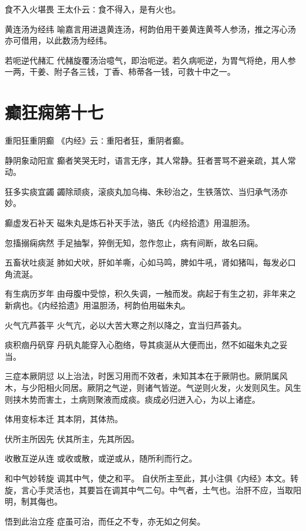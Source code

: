 \documentclass[a4paper,12pt,UTF8,twoside]{ctexbook}
\begin{document}
    食不入火堪畏
    王太仆云∶食不得入，是有火也。
    
    黄连汤为经纬
    喻嘉言用进退黄连汤，柯韵伯用干姜黄连黄芩人参汤，推之泻心汤亦可借用，以此数汤为经纬。
    
    若呃逆代赭汇
    代赭旋覆汤治噫气，即治呃逆。若久病呃逆，为胃气将绝，用人参一两，干姜、附子各三钱，丁香、柿蒂各一钱，可救十中之一。
    
    
    
    \section{癫狂痫第十七}
        
    重阳狂重阴癫
    《内经》云∶重阳者狂，重阴者癫。
    
    静阴象动阳宣
    癫者笑哭无时，语言无序，其人常静。狂者詈骂不避亲疏，其人常动。
    
    狂多实痰宜蠲
    蠲除顽痰，滚痰丸加乌梅、朱砂治之，生铁落饮、当归承气汤亦妙。
    
    癫虚发石补天
    磁朱丸是炼石补天手法，骆氏《内经拾遗》用温胆汤。
    
    忽搐搦痫病然
    手足抽掣，猝倒无知，忽作忽止，病有间断，故名曰痫。
    
    五畜状吐痰涎
    肺如犬吠，肝如羊嘶，心如马鸣，脾如牛吼，肾如猪叫，每发必口角流涎。
    
    有生病历岁年
    由母腹中受惊，积久失调，一触而发。病起于有生之初，非年来之新病也。《内经拾遗》用温胆汤，柯韵伯用磁朱丸。
    
    火气亢芦荟平
    火气亢，必以大苦大寒之剂以降之，宜当归芦荟丸。
    
    痰积痼丹矾穿
    丹矾丸能穿入心胞络，导其痰涎从大便而出，然不如磁朱丸之妥当。
    
    三症本厥阴愆
    以上治法，时医习用而不效者，未知其本在于厥阴也。厥阴属风木，与少阳相火同居。厥阴之气逆，则诸气皆逆。气逆则火发，火发则风生。风生则挟木势而害土，土病则聚液而成痰。痰成必归迸入心，为以上诸症。
    
    体用变标本迁
    其本阴，其体热。
    
    伏所主所因先
    伏其所主，先其所因。
    
    收散互逆从连
    或收或散，或逆或从，随所利而行之。
    
    和中气妙转旋
    调其中气，使之和平。
    自伏所主至此，其小注俱《内经》本文。转旋，言心手灵活也，其要旨在调其中气二句。中气者，土气也。治肝不应，当取阳明，制其侮也。
    
    悟到此治立痊
    症虽可治，而任之不专，亦无如之何矣。
    
\end{document}
